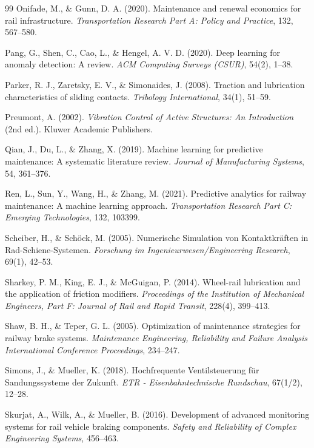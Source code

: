 \documentclass[a4paper,12pt]{article}
\theoremstyle{definition}
\theoremstyle{remark}
\begin{document}
\begin{thebibliography}{99}
 Onifade, M., \& Gunn, D. A. (2020). Maintenance and renewal economics for rail infrastructure. \textit{Transportation Research Part A: Policy and Practice}, 132, 567--580.

 Pang, G., Shen, C., Cao, L., \& Hengel, A. V. D. (2020). Deep learning for anomaly detection: A review. \textit{ACM Computing Surveys (CSUR)}, 54(2), 1--38.

 Parker, R. J., Zaretsky, E. V., \& Simonaides, J. (2008). Traction and lubrication characteristics of sliding contacts. \textit{Tribology International}, 34(1), 51--59.

 Preumont, A. (2002). \textit{Vibration Control of Active Structures: An Introduction} (2nd ed.). Kluwer Academic Publishers.

 Qian, J., Du, L., \& Zhang, X. (2019). Machine learning for predictive maintenance: A systematic literature review. \textit{Journal of Manufacturing Systems}, 54, 361--376.

 Ren, L., Sun, Y., Wang, H., \& Zhang, M. (2021). Predictive analytics for railway maintenance: A machine learning approach. \textit{Transportation Research Part C: Emerging Technologies}, 132, 103399.

 Scheiber, H., \& Schöck, M. (2005). Numerische Simulation von Kontaktkräften in Rad-Schiene-Systemen. \textit{Forschung im Ingenieurwesen/Engineering Research}, 69(1), 42--53.

 Sharkey, P. M., King, E. J., \& McGuigan, P. (2014). Wheel-rail lubrication and the application of friction modifiers. \textit{Proceedings of the Institution of Mechanical Engineers, Part F: Journal of Rail and Rapid Transit}, 228(4), 399--413.

 Shaw, B. H., \& Teper, G. L. (2005). Optimization of maintenance strategies for railway brake systems. \textit{Maintenance Engineering, Reliability and Failure Analysis International Conference Proceedings}, 234--247.

 Simons, J., \& Mueller, K. (2018). Hochfrequente Ventilsteuerung für Sandungssysteme der Zukunft. \textit{ETR - Eisenbahntechnische Rundschau}, 67(1/2), 12--28.

 Skurjat, A., Wilk, A., \& Mueller, B. (2016). Development of advanced monitoring systems for rail vehicle braking components. \textit{Safety and Reliability of Complex Engineering Systems}, 456--463.


\end{thebibliography}
\end{document}
